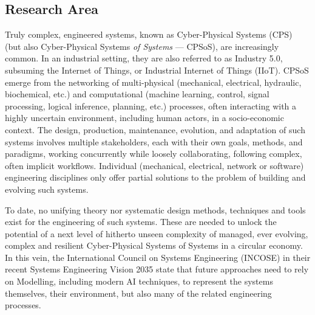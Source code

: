\subsection{Research Area}
\label{sec:ResearchArea}


Truly complex, engineered systems, known as Cyber-Physical Systems (CPS) (but
also Cyber-Physical Systems \emph{of Systems} --- CPSoS), are increasingly 
common. In an industrial setting, they are also referred to as Industry 5.0, subsuming the Internet of Things, or Industrial Internet of Things (IIoT). 
CPSoS emerge from the networking of multi-physical (mechanical, electrical, hydraulic,
biochemical, etc.) and computational (machine learning, control, signal processing, logical inference, planning, etc.) processes, often interacting with a highly uncertain environment, 
including human actors, in a socio-economic context. 
The design, production, maintenance, evolution, and adaptation of such systems 
involves multiple stakeholders, each with their own goals, methods, and paradigms, 
working concurrently while loosely collaborating, following complex, often implicit
workflows. Individual (mechanical, electrical, network or software) engineering 
disciplines only offer partial solutions to the problem of building and evolving 
such systems. 

To date, no unifying theory nor systematic design methods, techniques and tools exist
for the engineering of such systems. These are needed to unlock the potential of a next
level of hitherto unseen complexity of managed, ever evolving, complex and resilient
Cyber-Physical Systems of Systems in a circular economy. In this vein, the
International Council on Systems Engineering (INCOSE) in their recent Systems Engineering Vision 2035 \cite{TR:InCoSe-Vision:2035} state that future
approaches need to rely on Modelling, including modern AI techniques, 
to represent the systems themselves, their 
environment, but also many of the related engineering processes. 

